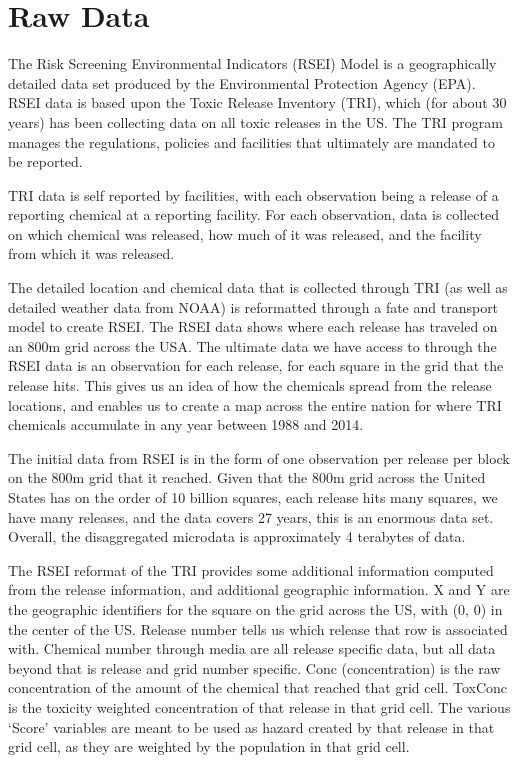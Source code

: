 \documentclass[12pt,twoside]{dukestatscithesis}
\theoremstyle{definition}
\theoremstyle{definition}
\theoremstyle{definition}
\theoremstyle{remark}
\begin{document}
\section{Raw Data}\label{raw-data}

The Risk Screening Environmental Indicators (RSEI) Model is a
geographically detailed data set produced by the Environmental
Protection Agency (EPA). RSEI data is based upon the Toxic Release
Inventory (TRI), which (for about 30 years) has been collecting data on
all toxic releases in the US. The TRI program manages the regulations,
policies and facilities that ultimately are mandated to be reported.

TRI data is self reported by facilities, with each observation being a
release of a reporting chemical at a reporting facility. For each
observation, data is collected on which chemical was released, how much
of it was released, and the facility from which it was released.

The detailed location and chemical data that is collected through TRI
(as well as detailed weather data from NOAA) is reformatted through a
fate and transport model to create RSEI. The RSEI data shows where each
release has traveled on an 800m grid across the USA. The ultimate data
we have access to through the RSEI data is an observation for each
release, for each square in the grid that the release hits. This gives
us an idea of how the chemicals spread from the release locations, and
enables us to create a map across the entire nation for where TRI
chemicals accumulate in any year between 1988 and 2014.

The initial data from RSEI is in the form of one observation per release
per block on the 800m grid that it reached. Given that the 800m grid
across the United States has on the order of 10 billion squares, each
release hits many squares, we have many releases, and the data covers 27
years, this is an enormous data set. Overall, the disaggregated
microdata is approximately 4 terabytes of data.

The RSEI reformat of the TRI provides some additional information
computed from the release information, and additional geographic
information. X and Y are the geographic identifiers for the square on
the grid across the US, with (0, 0) in the center of the US. Release
number tells us which release that row is associated with. Chemical
number through media are all release specific data, but all data beyond
that is release and grid number specific. Conc (concentration) is the
raw concentration of the amount of the chemical that reached that grid
cell. ToxConc is the toxicity weighted concentration of that release in
that grid cell. The various `Score' variables are meant to be used as
hazard created by that release in that grid cell, as they are weighted
by the population in that grid cell.
\end{document}
